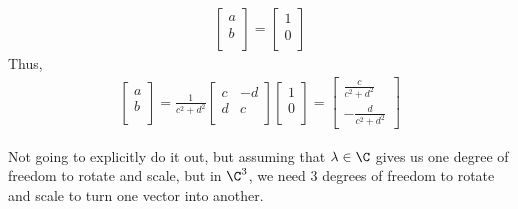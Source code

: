 \documentclass{book}
\begin{document}
\begin{enumerate}[label=\arabic*)]
\begin{align*}
        \begin{bmatrix}
          a \\
          b \\
        \end{bmatrix} =
        \begin{bmatrix}
          1 \\
          0 \\
        \end{bmatrix}
      \end{align*}
      Thus, 
      \begin{align*}
        \begin{bmatrix} 
          a \\ 
          b \\ 
        \end{bmatrix} = 
        \frac{1}{c^2 + d^2} 
        \begin{bmatrix} 
          c & -d \\ 
          d & c \\ 
        \end{bmatrix} 
        \begin{bmatrix} 
          1 \\ 
          0 \\ 
        \end{bmatrix} = 
        \begin{bmatrix} 
          \frac{c}{c^2 + d^2}
          \\ -\frac{d}{c^2 + d^2} 
        \end{bmatrix}
      \end{align*}
    \addtocounter{enumi}{3}
    \ii
      Not going to explicitly do it out, but assuming that $\lambda \in \C$ gives us one degree of freedom to rotate and scale, but in $\C^3$, we need 3 degrees of freedom to
      rotate and scale to turn one vector into another.
  \end{enumerate}
\end{document}
